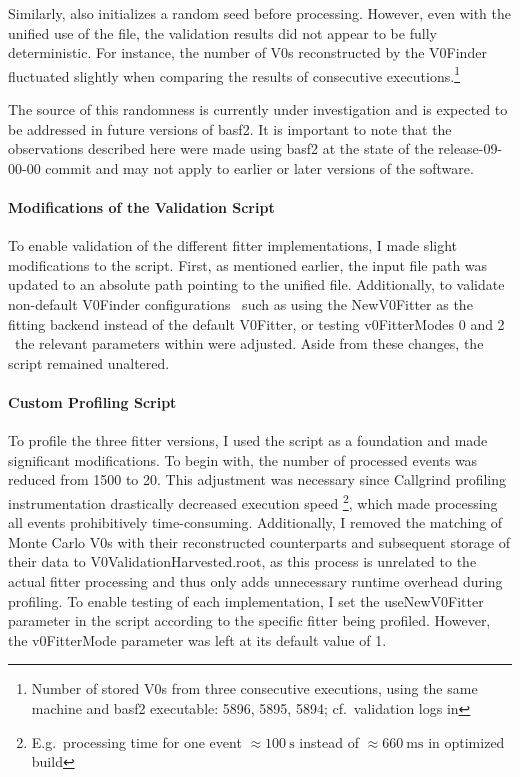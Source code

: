{Similarly, \genSample also initializes a random seed before processing. However, even with the unified use of the \genSimRoot file, the validation results did not appear to be fully deterministic.
For instance, the number of V0s reconstructed by the V0Finder fluctuated slightly when comparing the results of consecutive \genSample executions.\footnote{%
  Number of stored V0s from three consecutive \genSample executions, using the same machine and basf2 executable: 5896, 5895, 5894; cf.\ validation logs in 
}

The source of this randomness is currently under investigation and is expected to be addressed in future versions of basf2. It is important to note that the observations described here were made using basf2 at the state of the release-09-00-00 commit and may not apply to earlier or later versions of the software.

\paragraph{Modifications of the Validation Script}\label{par:val-mod}
To enable validation of the different fitter implementations, I made slight modifications to the \genSample script.
First, as mentioned earlier, the input file path was updated to an absolute path pointing to the unified \genSimRoot file.
Additionally, to validate non-default V0Finder configurations \textemdash\ such as using the NewV0Fitter as the fitting backend instead of the default V0Fitter, or testing v0FitterModes 0 and 2 \textemdash\ the relevant parameters within \genSample were adjusted.
Aside from these changes, the script remained unaltered.

\paragraph{Custom Profiling Script}
To profile the three fitter versions, I used the script \genSample as a foundation and made significant modifications.
To begin with, the number of processed events was reduced from 1500 to 20. 
This adjustment was necessary since Callgrind profiling instrumentation drastically decreased execution speed%
\footnote{E.g.\ processing time for one event $\approx\qty{100}{\second}$ instead of $\approx\qty{660}{\milli\second}$ in optimized build
}, which made processing all events prohibitively time-consuming.
Additionally, I removed the matching of Monte Carlo V0s with their reconstructed counterparts and subsequent storage of their data to V0ValidationHarvested.root, as this process is unrelated to the actual fitter processing and thus only adds unnecessary runtime overhead during profiling.
To enable testing of each implementation, I set the useNewV0Fitter parameter in the script according to the specific fitter being profiled.
However, the v0FitterMode parameter was left at its default value of 1.
}


